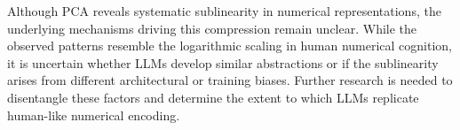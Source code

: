 Although PCA reveals systematic sublinearity in numerical representations, the underlying mechanisms driving this compression remain unclear. While the observed patterns resemble the logarithmic scaling in human numerical cognition, it is uncertain whether LLMs develop similar abstractions or if the sublinearity arises from different architectural or training biases. Further research is needed to disentangle these factors and determine the extent to which LLMs replicate human-like numerical encoding.